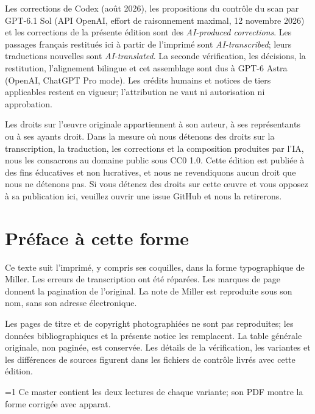 \documentclass[oneside]{book}
\theoremstyle{sga-source}
\theoremstyle{sga-source-dash}
\theoremstyle{sga-source-dotdash}
\theoremstyle{sga-source-number-note-dash}
\theoremstyle{sga-source-note-number-dotdash}
\theoremstyle{sga-source-example-dotdash}
\theoremstyle{sga-source-inline-number}
\theoremstyle{sga-source-bare-number}
\theoremstyle{sga-source}
\providecommand\EditionIsMaster{0}
\begin{document}
\medskip
Les corrections de Codex (août 2026), les propositions du contrôle du scan
par GPT-6.1 Sol (API OpenAI, effort de raisonnement maximal, 12 novembre
2026) et les corrections de la présente édition sont des
\emph{AI-produced corrections}. Les passages français restitués ici à
partir de l’imprimé sont \emph{AI-transcribed}; leurs traductions nouvelles
sont \emph{AI-translated}. La seconde vérification, les décisions, la
restitution, l’alignement bilingue et cet assemblage sont dus à GPT-6 Astra
(OpenAI, ChatGPT Pro mode). Les crédits humains et notices de tiers
applicables restent en vigueur; l’attribution ne vaut ni autorisation ni
approbation.

\medskip
Les droits sur l'œuvre originale appartiennent à son auteur, à ses représentants ou à ses ayants
droit. Dans la mesure où nous détenons des droits sur la transcription, la traduction, les corrections et la
composition produites par l'IA, nous les consacrons au domaine public sous CC0 1.0. Cette édition est publiée
à des fins éducatives et non lucratives, et nous ne revendiquons aucun droit que nous ne détenons pas. Si vous
détenez des droits sur cette œuvre et vous opposez à sa publication ici, veuillez ouvrir une issue GitHub et
nous la retirerons.

\chapter*{Préface à cette forme}
Ce texte suit l’imprimé, y compris ses coquilles, dans la forme
typographique de Miller. Les erreurs de transcription ont été réparées.
Les marques de page donnent la pagination de l’original. La note de Miller
est reproduite sous son nom, sans son adresse électronique.

Les pages de titre et de copyright photographiées ne sont pas reproduites;
les données bibliographiques et la présente notice les remplacent. La
table générale originale, non paginée, est conservée. Les détails de la
vérification, les variantes et les différences de sources figurent dans
les fichiers de contrôle livrés avec cette édition.

\ifnum\EditionIsMaster=1\relax
Ce master contient les deux lectures de chaque variante; son PDF montre la forme corrigée avec apparat.
\fi

\clearpage

\or
\end{document}
